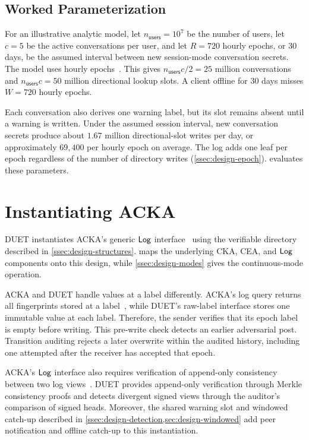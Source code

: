\subsection{Worked Parameterization}\label{ssec:design-param}

For an illustrative analytic model, let $n_{\mathsf{users}}=10^7$ be the number of users, let $c=5$ be the active
conversations per user, and let $R=720$ hourly epochs, or 30 days, be the assumed interval between new session-mode
conversation secrets. The model uses hourly epochs~\cite[Section~5.3]{melara2015coniks}. This gives
$n_{\mathsf{users}}c/2=25$ million conversations and $n_{\mathsf{users}}c=50$ million directional lookup slots. A client offline for
30 days misses $W=720$ hourly epochs.

Each conversation also derives one warning label, but its slot remains absent until a warning is
written. Under the assumed session interval, new conversation secrets produce about $1.67$ million
directional-slot writes per day, or approximately $69{,}400$ per hourly epoch on average. The log
adds one leaf per epoch regardless of the number of directory writes
(\cref{ssec:design-epoch}).  evaluates these parameters.

\FloatBarrier
\section{Instantiating ACKA}\label{sec:design-acka}

DUET instantiates ACKA's generic $\mathsf{Log}$ interface~\cite[Section~2.3]{dowling2023acka} using the
verifiable directory described in \cref{ssec:design-structures}.  maps the
underlying CKA, CEA, and $\mathsf{Log}$ components onto this design, while \cref{ssec:design-modes} gives
the continuous-mode operation.

ACKA and DUET handle values at a label differently. ACKA's log query returns all fingerprints
stored at a label~\cite[Section~2.3]{dowling2023acka}, while DUET's raw-label interface stores one
immutable value at each label. Therefore, the sender verifies that its epoch label is empty before
writing. This pre-write check detects an earlier adversarial post. Transition auditing rejects a
later overwrite within the audited history, including one attempted after the receiver has accepted
that epoch.

ACKA's $\mathsf{Log}$ interface also requires verification of append-only consistency between two log
views~\cite[Section~2.3]{dowling2023acka}. DUET provides append-only verification through Merkle
consistency proofs and detects divergent signed views through the auditor's comparison of signed
heads. Moreover, the shared warning slot and windowed catch-up described in
\cref{ssec:design-detection,sec:design-windowed} add peer notification and offline catch-up to this
instantiation.


